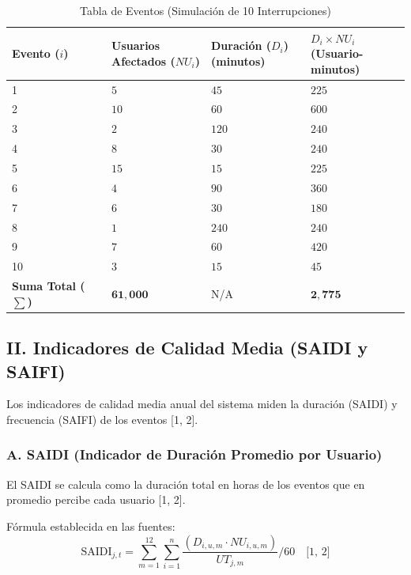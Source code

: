 \documentclass[a5paper]{book}%
\begin{document}
    \begin{table}[h]
    	\centering
    	\caption{Tabla de Eventos (Simulación de 10 Interrupciones)}
    	\begin{tabular}{|p{0.25\linewidth}|p{0.25\linewidth}|p{0.25\linewidth}|p{0.25\linewidth}|}
    		\hline
    		\textbf{Evento ($i$)} & \textbf{Usuarios Afectados ($NU_i$)} & \textbf{Duración ($D_i$)} (minutos) & \textbf{$D_i \times NU_i$} (Usuario-minutos) \\
    		\hline
    		1 & $5$ & $45$ & $225$ \\
    		2 & $10$ & $60$ & $600$ \\
    		3 & $2$ & $120$ & $240$ \\
    		4 & $8$ & $30$ & $240$ \\
    		5 & $15$ & $15$ & $225$ \\
    		6 & $4$ & $90$ & $360$ \\
    		7 & $6$ & $30$ & $180$ \\
    		8 & $1$ & $240$ & $240$ \\
    		9 & $7$ & $60$ & $420$ \\
    		10 & $3$ & $15$ & $45$ \\\hline
    		\textbf{Suma Total ($\sum$)} & $\mathbf{61,000}$ & N/A & $\mathbf{2,775}$ \\\hline
    		\end{tabular}
    \end{table}
    
    \subsection*{II. Indicadores de Calidad Media (SAIDI y SAIFI)}
    
    Los indicadores de calidad media anual del sistema miden la duración (SAIDI) y frecuencia (SAIFI) de los eventos [1, 2].
    
    \subsubsection*{A. SAIDI (Indicador de Duración Promedio por Usuario)}
    
    El SAIDI se calcula como la duración total en horas de los eventos que en promedio percibe cada usuario [1, 2].
    
    Fórmula establecida en las fuentes:
    $$\text{SAIDI}_{j,t} = \sum_{m=1}^{12} \sum_{i=1}^{n} \frac{(D_{i,u,m} \cdot NU_{i,u,m})}{UT_{j,m}} / 60 \quad \text{[1, 2]}$$
    
\end{document}
